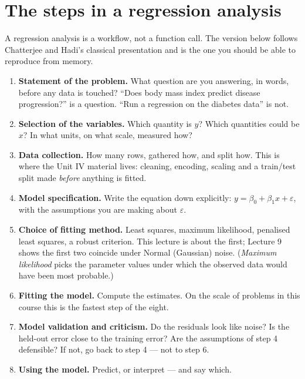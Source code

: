 \documentclass[11pt]{article}
\begin{document}
\section{The steps in a regression analysis}
\label{sec:steps}

A regression analysis is a workflow, not a function call. The version below
follows Chatterjee and Hadi's classical presentation and is the one you should
be able to reproduce from memory.

\begin{enumerate}[leftmargin=*]
  \item \textbf{Statement of the problem.} What question are you answering, in
    words, before any data is touched? ``Does body mass index predict disease
    progression?'' is a question. ``Run a regression on the diabetes data'' is
    not.
  \item \textbf{Selection of the variables.} Which quantity is $y$? Which
    quantities could be $x$? In what units, on what scale, measured how?
  \item \textbf{Data collection.} How many rows, gathered how, and split how.
    This is where the Unit IV material lives: cleaning, encoding, scaling and
    a train/test split made \emph{before} anything is fitted.
  \item \textbf{Model specification.} Write the equation down explicitly:
    $y = \beta_0 + \beta_1x + \varepsilon$, with the assumptions you are
    making about $\varepsilon$.
  \item \textbf{Choice of fitting method.} Least squares, maximum likelihood,
    penalised least squares, a robust criterion. This lecture is about the
    first; Lecture 9 shows the first two coincide under Normal (Gaussian)
    noise. (\emph{Maximum likelihood} picks the parameter values under which
    the observed data would have been most probable.)
  \item \textbf{Fitting the model.} Compute the estimates. On the scale of
    problems in this course this is the fastest step of the eight.
  \item \textbf{Model validation and criticism.} Do the residuals look like
    noise? Is the held-out error close to the training error? Are the
    assumptions of step 4 defensible? If not, go back to step 4 --- not to
    step 6.
  \item \textbf{Using the model.} Predict, or interpret --- and say which.
\end{enumerate}
\end{document}
